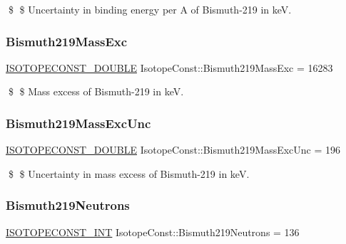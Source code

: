 \$ \$ Uncertainty in binding energy per A of Bismuth-\/219 in keV. \mbox{\label{group___isotope_const-_bismuth-_bi219_gaa68030a7fe6c00930d5a930977e8b6ca}} 
\subsubsection{\texorpdfstring{Bismuth219\+Mass\+Exc}{Bismuth219MassExc}}
{\footnotesize\ttfamily \mbox{\hyperlink{group___isotope_const-_macros_ga8f45a7272ce02c0b4c65c44636ed719a}{I\+S\+O\+T\+O\+P\+E\+C\+O\+N\+S\+T\+\_\+\+D\+O\+U\+B\+LE}} Isotope\+Const\+::\+Bismuth219\+Mass\+Exc = 16283}

\$ \$ Mass excess of Bismuth-\/219 in keV. \mbox{\label{group___isotope_const-_bismuth-_bi219_gad794e0e54a01e95fea66d780b960d99f}} 
\subsubsection{\texorpdfstring{Bismuth219\+Mass\+Exc\+Unc}{Bismuth219MassExcUnc}}
{\footnotesize\ttfamily \mbox{\hyperlink{group___isotope_const-_macros_ga8f45a7272ce02c0b4c65c44636ed719a}{I\+S\+O\+T\+O\+P\+E\+C\+O\+N\+S\+T\+\_\+\+D\+O\+U\+B\+LE}} Isotope\+Const\+::\+Bismuth219\+Mass\+Exc\+Unc = 196}

\$ \$ Uncertainty in mass excess of Bismuth-\/219 in keV. \mbox{\label{group___isotope_const-_bismuth-_bi219_ga9980200724d6bad8076498ff11a7f5d9}} 
\subsubsection{\texorpdfstring{Bismuth219\+Neutrons}{Bismuth219Neutrons}}
{\footnotesize\ttfamily \mbox{\hyperlink{group___isotope_const-_macros_ga5f18360b3e99483a35c32d789e62621c}{I\+S\+O\+T\+O\+P\+E\+C\+O\+N\+S\+T\+\_\+\+I\+NT}} Isotope\+Const\+::\+Bismuth219\+Neutrons = 136}

